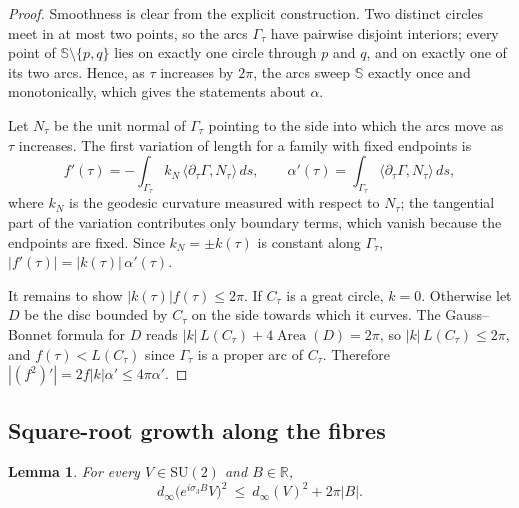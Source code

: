 \documentclass[11pt]{amsart}
\newtheorem{lemma}[theorem]{Lemma}
\theoremstyle{definition}
\newcommand{\RR}{\mathbb{R}}
\newcommand{\SU}{\mathrm{SU}(2)}
\newcommand{\Sp}{\mathbb{S}}
\newcommand{\dinf}{d_{\infty}}
\DeclareMathOperator{\Area}{Area}
\begin{document}
\begin{proof}
Smoothness is clear from the explicit construction. Two distinct circles meet in at most two points, so the arcs $\Gamma_\tau$ have pairwise disjoint interiors; every point of $\Sp\setminus\{p,q\}$ lies on exactly one circle through $p$ and $q$, and on exactly one of its two arcs. Hence, as $\tau$ increases by $2\pi$, the arcs sweep $\Sp$ exactly once and monotonically, which gives the statements about $\alpha$.

Let $N_\tau$ be the unit normal of $\Gamma_\tau$ pointing to the side into which the arcs move as $\tau$ increases. The first variation of length for a family with fixed endpoints is
\[
f'(\tau)=-\int_{\Gamma_\tau}k_N\,\langle\partial_\tau\Gamma,N_\tau\rangle\,ds,\qquad \alpha'(\tau)=\int_{\Gamma_\tau}\langle\partial_\tau\Gamma,N_\tau\rangle\,ds,
\]
where $k_N$ is the geodesic curvature measured with respect to $N_\tau$; the tangential part of the variation contributes only boundary terms, which vanish because the endpoints are fixed. Since $k_N=\pm k(\tau)$ is constant along $\Gamma_\tau$, $|f'(\tau)|=|k(\tau)|\,\alpha'(\tau)$.

It remains to show $|k(\tau)|f(\tau)\le 2\pi$. If $C_\tau$ is a great circle, $k=0$. Otherwise let $D$ be the disc bounded by $C_\tau$ on the side towards which it curves. The Gauss--Bonnet formula for $D$ reads $|k|\,L(C_\tau)+4\Area(D)=2\pi$, so $|k|\,L(C_\tau)\le2\pi$, and $f(\tau)<L(C_\tau)$ since $\Gamma_\tau$ is a proper arc of $C_\tau$. Therefore $|(f^2)'|=2f|k|\alpha'\le4\pi\alpha'$.
\end{proof}

\subsection{Square-root growth along the fibres}

\begin{lemma}\label{lem:sqrt}
For every $V\in\SU$ and $B\in\RR$,
\[
\dinf\bigl(e^{i\sigma_3B}V\bigr)^2\ \le\ \dinf(V)^2+2\pi|B| .
\]
\end{lemma}
\end{document}
